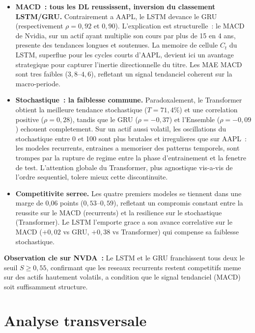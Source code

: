 \documentclass[12pt, a4paper]{article}
\begin{document}
\begin{itemize}
  \item \textbf{MACD~: tous les DL reussissent, inversion du classement LSTM/GRU.} Contrairement a AAPL, le LSTM devance le GRU (respectivement $\rho = 0{,}92$ et $0{,}90$). L'explication est structurelle~: le MACD de Nvidia, sur un actif ayant multiplie son cours par plus de 15 en 4 ans, presente des tendances longues et soutenues. La memoire de cellule $C_t$ du LSTM, superflue pour les cycles courts d'AAPL, devient ici un avantage strategique pour capturer l'inertie directionnelle du titre. Les MAE MACD sont tres faibles ($3{,}8$--$4{,}6$), refletant un signal tendanciel coherent sur la macro-periode.

  \item \textbf{Stochastique~: la faiblesse commune.} Paradoxalement, le Transformer obtient la meilleure tendance stochastique ($T = 71{,}4\%$) et une correlation positive ($\rho = 0{,}28$), tandis que le GRU ($\rho = -0{,}37$) et l'Ensemble ($\rho = -0{,}09$) echouent completement. Sur un actif aussi volatil, les oscillations du stochastique entre 0 et 100 sont plus brutales et irregulieres que sur AAPL~: les modeles recurrents, entraines a memoriser des patterns temporels, sont trompes par la rupture de regime entre la phase d'entrainement et la fenetre de test. L'attention globale du Transformer, plus agnostique vis-a-vis de l'ordre sequentiel, tolere mieux cette discontinuite.

  \item \textbf{Competitivite serree.} Les quatre premiers modeles se tiennent dans une marge de 0,06 points ($0{,}53$--$0{,}59$), refletant un compromis constant entre la reussite sur le MACD (recurrents) et la resilience sur le stochastique (Transformer). Le LSTM l'emporte grace a son avance correlative sur le MACD ($+0{,}02$ vs GRU, $+0{,}38$ vs Transformer) qui compense sa faiblesse stochastique.
\end{itemize}

\begin{resultbox}
\textbf{Observation cle sur NVDA~:} Le LSTM et le GRU franchissent tous deux le seuil $S \geq 0{,}55$, confirmant que les reseaux recurrents restent competitifs meme sur des actifs hautement volatils, a condition que le signal tendanciel (MACD) soit suffisamment structure.
\end{resultbox}

\section{Analyse transversale}
\end{document}
